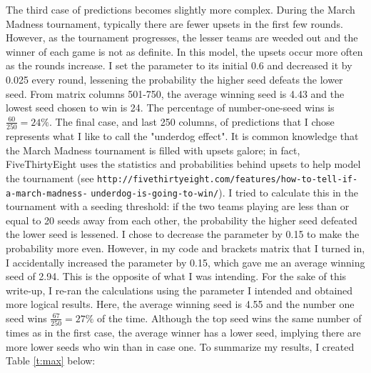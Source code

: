 \documentclass[11pt]{article}
\begin{document}
\begin{flushleft}
	\newline
	\newline
	The third case of predictions becomes slightly more complex. During the March Madness tournament, typically there are fewer upsets in the first few rounds. However, as the tournament progresses, the lesser teams are weeded out and the winner of each game is not as definite. In this model, the upsets occur more often as the rounds increase. I set the parameter to its initial 0.6 and decreased it by 0.025 every round, lessening the probability the higher seed defeats the lower seed. From matrix columns 501-750, the average winning seed is 4.43 and the lowest seed chosen to win is 24. The percentage of number-one-seed wins is \(\frac{60}{250} = 24\%\).
	\newline
	\newline
	The final case, and last 250 columns, of predictions that I chose represents what I like to call the "underdog effect". It is common knowledge that the March Madness tournament is filled with upsets galore; in fact, FiveThirtyEight uses the statistics and probabilities behind upsets to help model the tournament (see \verb|http://fivethirtyeight.com/features/how-to-tell-if-a-march-madness-|
	\newline
	\verb|underdog-is-going-to-win/|). I tried to calculate this in the tournament with a seeding threshold: if the two teams playing are less than or equal to 20 seeds away from each other, the probability the higher seed defeated the lower seed is lessened. I chose to decrease the parameter by 0.15 to make the probability more even. However, in my code and brackets matrix that I turned in, I accidentally increased the parameter by 0.15, which gave me an average winning seed of 2.94. This is the opposite of what I was intending. For the sake of this write-up, I re-ran the calculations using the parameter I intended and obtained more logical results. Here, the average winning seed is 4.55 and the number one seed wins \(\frac{67}{250} = 27\%\) of the time. Although the top seed wins the same number of times as in the first case, the average winner has a lower seed, implying there are more lower seeds who win than in case one. 
	\newline
	\newline
	To summarize my results, I created Table \ref{t:max} below:
\end{flushleft}
\end{document}
